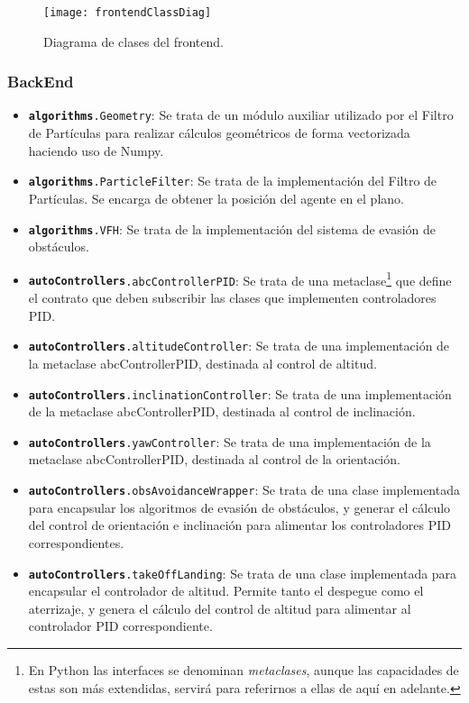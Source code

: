 \begin{figure}[H]
	\centering
	\texttt{[image: frontendClassDiag]}
	\caption[Diagrama de clases FrontEnd]{Diagrama de clases del frontend.}\label{fig:frontendClassDiag}
\end{figure}



\subsubsection{BackEnd}

\begin{itemize}
\item \texttt{\textbf{algorithms}.Geometry}: Se trata de un módulo auxiliar utilizado por el Filtro de Partículas para realizar cálculos geométricos de forma vectorizada haciendo uso de Numpy.
\item \texttt{\textbf{algorithms}.ParticleFilter}: Se trata de la implementación del Filtro de Partículas. Se encarga de obtener la posición del agente en el plano.
\item \texttt{\textbf{algorithms}.VFH}: Se trata de la implementación del sistema de evasión de obstáculos. 
\item \texttt{\textbf{autoControllers}.abcControllerPID}: Se trata de una metaclase\footnote{En Python las interfaces se denominan \emph{metaclases}, aunque las capacidades de estas son más extendidas, servirá para referirnos a ellas de aquí en adelante.} que define el contrato que deben subscribir las clases que implementen controladores PID.
\item \texttt{\textbf{autoControllers}.altitudeController}: Se trata de una implementación de la metaclase abcControllerPID, destinada al control de altitud.
\item \texttt{\textbf{autoControllers}.inclinationController}: Se trata de una implementación de la metaclase abcControllerPID, destinada al control de inclinación.
\item \texttt{\textbf{autoControllers}.yawController}: Se trata de una implementación de la metaclase abcControllerPID, destinada al control de la orientación.
\item \texttt{\textbf{autoControllers}.obsAvoidanceWrapper}: Se trata de una clase implementada para encapsular los algoritmos de evasión de obstáculos, y generar el cálculo del control de orientación e inclinación para alimentar los controladores PID correspondientes.
\item \texttt{\textbf{autoControllers}.takeOffLanding}: Se trata de una clase implementada para encapsular el controlador de altitud. Permite tanto el despegue como el aterrizaje, y genera el cálculo del control de altitud para alimentar al controlador PID correspondiente. 

\end{itemize}
